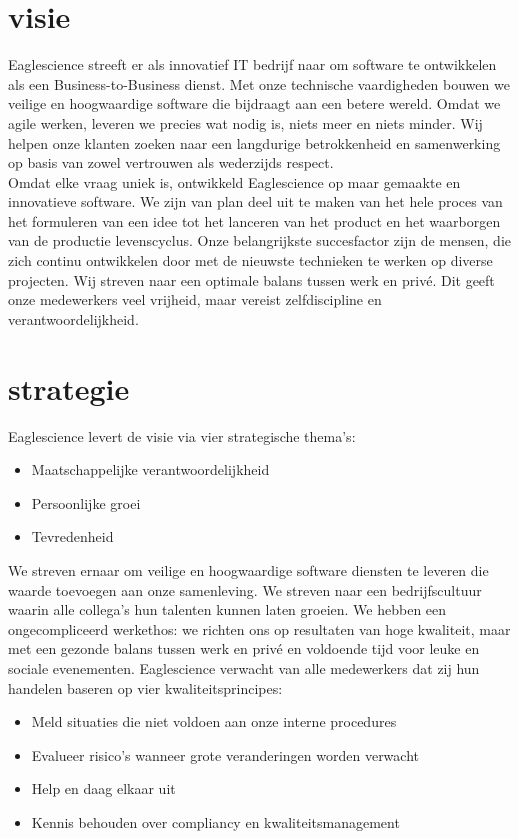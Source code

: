 \section{visie}
Eaglescience streeft er als innovatief IT bedrijf naar om software te ontwikkelen als een Business-to-Business dienst. Met onze technische vaardigheden bouwen we veilige en hoogwaardige software die bijdraagt aan een betere wereld. Omdat we agile werken, leveren we precies wat nodig is, niets meer en niets minder. Wij helpen onze klanten zoeken naar een langdurige betrokkenheid en samenwerking op basis van zowel vertrouwen als wederzijds respect. \\
Omdat elke vraag uniek is, ontwikkeld Eaglescience op maar gemaakte en innovatieve software. We zijn van plan deel uit te maken van het hele proces van het formuleren van een idee tot het lanceren van het product en het waarborgen van de productie levenscyclus. Onze belangrijkste succesfactor zijn de mensen, die zich continu ontwikkelen door met de nieuwste technieken te werken op diverse projecten. Wij streven naar een optimale balans tussen werk en priv\'e. Dit geeft onze medewerkers veel vrijheid, maar vereist zelfdiscipline en verantwoordelijkheid.

\section{strategie}
Eaglescience levert de visie via vier strategische thema's:
\begin{itemize}
\item Maatschappelijke verantwoordelijkheid
\item Persoonlijke groei
\item Tevredenheid
\end{itemize}
We streven ernaar om veilige en hoogwaardige software diensten te leveren die waarde toevoegen aan onze samenleving. We streven naar een bedrijfscultuur waarin alle collega's hun talenten kunnen laten groeien. We hebben een ongecompliceerd werkethos: we richten ons op resultaten van hoge kwaliteit, maar met een gezonde balans tussen werk en priv\'e en voldoende tijd voor leuke en sociale evenementen. Eaglescience verwacht van alle medewerkers dat zij hun handelen baseren op vier kwaliteitsprincipes:
\begin{itemize}
\item Meld situaties die niet voldoen aan onze interne procedures
\item Evalueer risico's wanneer grote veranderingen worden verwacht
\item Help en daag elkaar uit
\item Kennis behouden over compliancy en kwaliteitsmanagement
\end{itemize}

